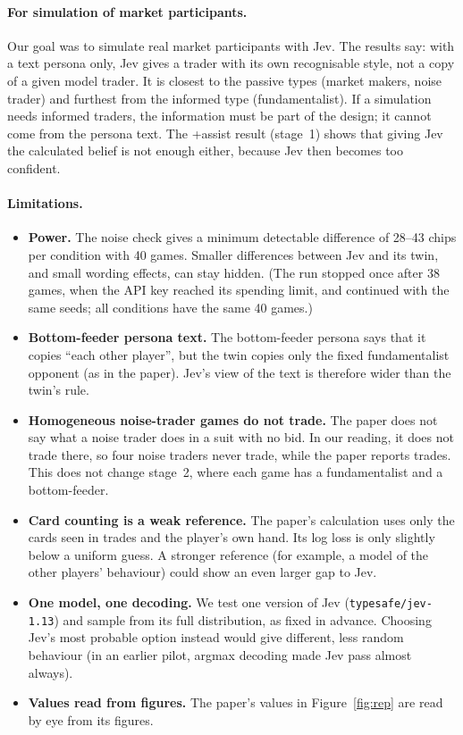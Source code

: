 \paragraph{For simulation of market participants.} Our goal was to simulate real market participants with Jev. The
results say: with a text persona only, Jev gives a trader with its own recognisable style, not a copy of a given model
trader. It is closest to the passive types (market makers, noise trader) and furthest from the informed type
(fundamentalist). If a simulation needs informed traders, the information must be part of the design; it cannot come
from the persona text. The +assist result (stage~1) shows that giving Jev the calculated belief is not enough either,
because Jev then becomes too confident.

\paragraph{Limitations.}\label{sec:limits}
\begin{itemize}
\item \textbf{Power.} The noise check gives a minimum detectable difference of 28--43 chips per condition with 40
games. Smaller differences between Jev and its twin, and small wording effects, can stay hidden. (The run stopped once
after 38 games, when the API key reached its spending limit, and continued with the same seeds; all conditions have the
same 40 games.)
\item \textbf{Bottom-feeder persona text.} The bottom-feeder persona says that it copies ``each other player'', but
the twin copies only the fixed fundamentalist opponent (as in the paper). Jev's view of the text is therefore wider than
the twin's rule.
\item \textbf{Homogeneous noise-trader games do not trade.} The paper does not say what a noise trader does in a suit
with no bid. In our reading, it does not trade there, so four noise traders never trade, while the paper reports trades.
This does not change stage~2, where each game has a fundamentalist and a bottom-feeder.
\item \textbf{Card counting is a weak reference.} The paper's calculation uses only the cards seen in trades and the
player's own hand. Its log loss is only slightly below a uniform guess. A stronger reference (for example, a model of the
other players' behaviour) could show an even larger gap to Jev.
\item \textbf{One model, one decoding.} We test one version of Jev (\texttt{typesafe/jev-1.13}) and sample from its full
distribution, as fixed in advance. Choosing Jev's most probable option instead would give different, less random
behaviour (in an earlier pilot, argmax decoding made Jev pass almost always).
\item \textbf{Values read from figures.} The paper's values in Figure~\ref{fig:rep} are read by eye from its figures.
\end{itemize}
